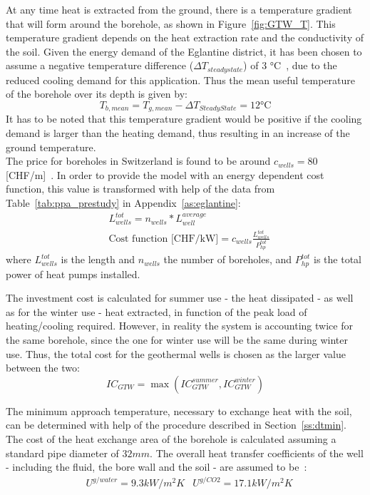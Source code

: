 \documentclass{article}
\begin{document}
At any time heat is extracted from the ground, there is a temperature gradient that will form around the borehole, as shown in Figure~\ref{fig:GTW_T}. This temperature gradient depends on the heat extraction rate and the conductivity of the soil. Given the energy demand of the Eglantine district, it has been chosen to assume a negative temperature difference ($\Delta T_{steady state}$) of 3 \si{\celsius}~\cite{guoTechnoeconomicComparisonDirect2012,hanSensitivityAnalysisVertical2016}, due to the reduced cooling demand for this application. Thus the mean useful temperature of the borehole over its depth is given by:
\begin{equation}
	T_{b, mean} = T_{g, mean} -\Delta T_{Steady State} = 12 \si{\celsius}
\end{equation}
It has to be noted that this temperature gradient would be positive if the cooling demand is larger than the heating demand, thus resulting in an increase of the ground temperature.\\

The price for boreholes in Switzerland is found to be around $c_{wells} = 80$ [CHF/m]~\cite{bawos.chMitErdsondenbohrungenKosten2018}. 
In order to provide the model with an energy dependent cost function, this value is transformed with help of the data from Table~\ref{tab:ppa_prestudy} in Appendix~\ref{as:eglantine}:
\begin{align}
&  L_{wells}^{tot} = n_{wells} * L_{well}^{average} \\
& 	\text{Cost function [CHF/kW]} = c_{wells} \frac{L_{wells}^{tot}}{P_{hp}^{tot}}
\end{align}
where $L_{wells}^{tot}$ is the length and $n_{wells}$ the number of boreholes, and $P_{hp}^{tot}$ is the total power of heat pumps installed. 

The investment cost is calculated for summer use - the heat dissipated - as well as for the winter use - heat extracted, in function of the peak load of heating/cooling required. However, in reality the system is accounting twice for the same borehole, since the one for winter use will be the same during winter use. Thus, the total cost for the geothermal wells is chosen as the larger value between the two:
\begin{equation}
IC_{GTW} = 	\max \left( IC_{GTW}^{summer}, IC_{GTW}^{winter} \right) 
\end{equation}

The minimum approach temperature, necessary to exchange heat with the soil, can be determined with help of the procedure described in Section~\ref{ss:dtmin}. 
The cost of the heat exchange area of the borehole is calculated assuming a standard pipe diameter of $32 mm$\cite{siaSIA384Sondes2010, kruseStatusDevelopmentResearch2010}.
The overall heat transfer coefficients of the well - including the fluid, the bore wall and the soil - are assumed to be~\cite{kruseStatusDevelopmentResearch2010}:
\begin{align}
	& U^{g/water} = 9.3 kW/m^2K
	& U^{g/CO2} = 17.1 kW/m^2K
\end{align}
\end{document}
